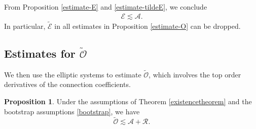 \documentclass[11pt,reqno]{amsart}
\theoremstyle{definition}
\newtheorem{proposition}{Proposition}[section]
\numberwithin{equation}{section}
\begin{document}
From Proposition \ref{estimate-E} and \ref{estimate-tildeE}, we conclude
\begin{align*}
\mathcal{E}\lesssim\mathcal{A}.
\end{align*}
In particular, $\widetilde{\mathcal{E}}$ in all estimates in Proposition \ref{estimate-O} can be dropped.

\subsection{Estimates for $\widetilde{\mathcal{O}}$} We then use the elliptic systems to estimate $\widetilde{\mathcal{O}}$, which involves the top order derivatives of the connection coefficients. %
\begin{proposition}\label{estimate-tildeO}
Under the assumptions of Theorem \ref{existencetheorem} and the bootstrap assumptions \eqref{bootstrap}, we have
$$\widetilde{\mathcal{O}}\lesssim\mathcal{A}+\mathcal{R}.$$
\end{proposition}
\end{document}

